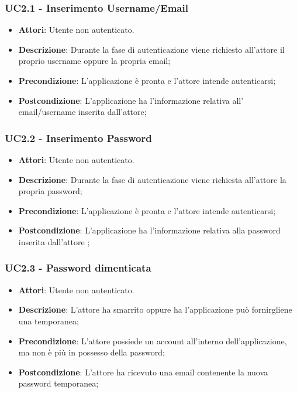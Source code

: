 \subsubsection{UC2.1 - Inserimento Username/Email} 
\label{sssec:UC2.1} 
\begin{itemize} 
\item \textbf{Attori}: Utente non autenticato.
\item \textbf{Descrizione}: Durante la fase di autenticazione viene richiesto all'attore il proprio username oppure la propria email;
\item \textbf{Precondizione}: L'applicazione è pronta e l'attore intende autenticarsi;
\item \textbf{Postcondizione}: L'applicazione ha l’informazione relativa all' email/username inserita dall’attore;
\end{itemize} 
\subsubsection{UC2.2 - Inserimento Password} 
\label{sssec:UC2.2} 
\begin{itemize} 
\item \textbf{Attori}: Utente non autenticato.
\item \textbf{Descrizione}: Durante la fase di autenticazione viene richiesta all'attore la propria password;
\item \textbf{Precondizione}: L'applicazione è pronta e l'attore intende autenticarsi;
\item \textbf{Postcondizione}: L'applicazione ha l’informazione relativa alla password inserita dall’attore
;
\end{itemize} 
\subsubsection{UC2.3 - Password dimenticata} 
\label{sssec:UC2.3} 
\begin{itemize} 
\item \textbf{Attori}: Utente non autenticato.
\item \textbf{Descrizione}: L'attore ha smarrito oppure ha l'applicazione può fornirgliene una temporanea;
\item \textbf{Precondizione}: L'attore possiede un account all'interno dell'applicazione, ma non è più in possesso della password;
\item \textbf{Postcondizione}: L'attore ha ricevuto una email contenente la nuova password temporanea;
\end{itemize} 
